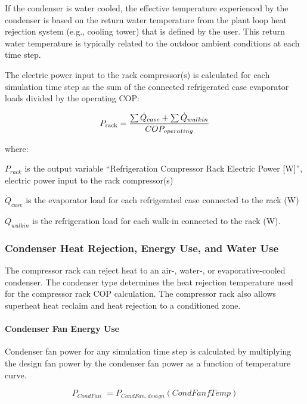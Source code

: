 If the condenser is water cooled, the effective temperature experienced by the condenser is based on the return water temperature from the plant loop heat rejection system (e.g., cooling tower) that is defined by the user. This return water temperature is typically related to the outdoor ambient conditions at each time step.

The electric power input to the rack compressor(s) is calculated for each simulation time step as the sum of the connected refrigerated case evaporator loads divided by the operating COP:

\begin{equation}
{P_{{\rm{rack}}}} = \frac{{\sum {{{\dot Q}_{case}} + \sum {{{\dot Q}_{walkin}}} } }}{{CO{P_{operating}}}}
\end{equation}

where:

\({P_{rack}}\) is the output variable ``Refrigeration Compressor Rack Electric Power {[}W{]}'', electric power input to the rack compressor(s)

\({\dot Q_{case}}\) is the evaporator load for each refrigerated case connected to the rack (W)

\({\dot Q_{walkin}}\) is the refrigeration load for each walk-in connected to the rack (W).

\subsubsection{Condenser Heat Rejection, Energy Use, and Water Use}\label{condenser-heat-rejection-energy-use-and-water-use}

The compressor rack can reject heat to an air-, water-, or evaporative-cooled condenser. The condenser type determines the heat rejection temperature used for the compressor rack COP calculation. The compressor rack also allows superheat heat reclaim and heat rejection to a conditioned zone.

\paragraph{Condenser Fan Energy Use}\label{condenser-fan-energy-use}

Condenser fan power for any simulation time step is calculated by multiplying the design fan power by the condenser fan power as a function of temperature curve.

\begin{equation}
{P_{CondFan}}\,\, = {P_{CondFan,design}}\left( {CondFanfTemp} \right)
\end{equation}

